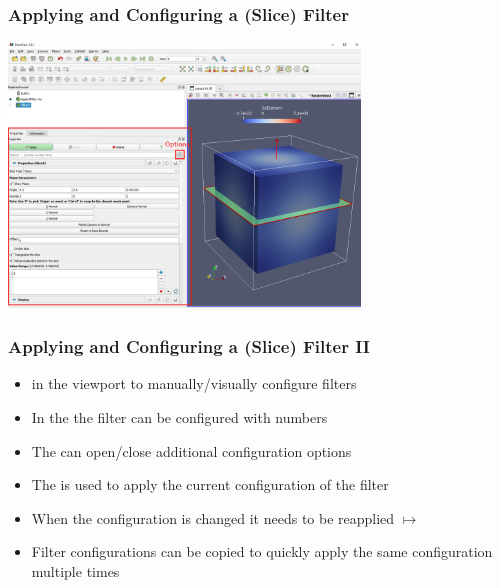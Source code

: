 \begin{frame}
  \frametitle{Applying and Configuring a (Slice) Filter}
	\begin{center}
	\includegraphics[width=0.7\textwidth]{screenshots/filter-apply.png}		
	\end{center}
\end{frame}

\begin{frame}
  \frametitle{Applying and Configuring a (Slice) Filter II}
    \begin{itemize}
      \item {} in the viewport to manually/visually configure filters
      \item In the  the filter can be configured with numbers
      \item The  can open/close additional configuration options			
      \item The  is used to apply the current configuration of the filter						
      \item When the configuration is changed it needs to be reapplied $\mapsto$ 
			\item Filter configurations can be copied to quickly apply the same configuration multiple times
    \end{itemize}
\end{frame}

